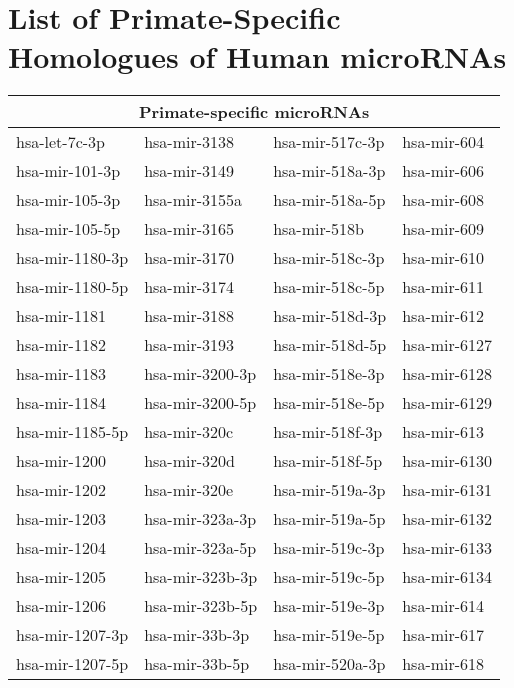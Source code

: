 \chapter{List of Primate-Specific Homologues of Human microRNAs} 
\label{appendix:homologues}

\begin{table}[h]
\centering
\vspace{90pt}
\begin{tabular}{|l|l|l|l|}
\hline
\multicolumn{4}{|c|}{\bf Primate-specific microRNAs} \\
\hline
  \hline
hsa-let-7c-3p & hsa-mir-3138 & hsa-mir-517c-3p & hsa-mir-604 \\ 
  hsa-mir-101-3p & hsa-mir-3149 & hsa-mir-518a-3p & hsa-mir-606 \\ 
  hsa-mir-105-3p & hsa-mir-3155a & hsa-mir-518a-5p & hsa-mir-608 \\ 
  hsa-mir-105-5p & hsa-mir-3165 & hsa-mir-518b & hsa-mir-609 \\ 
  hsa-mir-1180-3p & hsa-mir-3170 & hsa-mir-518c-3p & hsa-mir-610 \\ 
  hsa-mir-1180-5p & hsa-mir-3174 & hsa-mir-518c-5p & hsa-mir-611 \\ 
  hsa-mir-1181 & hsa-mir-3188 & hsa-mir-518d-3p & hsa-mir-612 \\ 
  hsa-mir-1182 & hsa-mir-3193 & hsa-mir-518d-5p & hsa-mir-6127 \\ 
  hsa-mir-1183 & hsa-mir-3200-3p & hsa-mir-518e-3p & hsa-mir-6128 \\ 
  hsa-mir-1184 & hsa-mir-3200-5p & hsa-mir-518e-5p & hsa-mir-6129 \\ 
  hsa-mir-1185-5p & hsa-mir-320c & hsa-mir-518f-3p & hsa-mir-613 \\ 
  hsa-mir-1200 & hsa-mir-320d & hsa-mir-518f-5p & hsa-mir-6130 \\ 
  hsa-mir-1202 & hsa-mir-320e & hsa-mir-519a-3p & hsa-mir-6131 \\ 
  hsa-mir-1203 & hsa-mir-323a-3p & hsa-mir-519a-5p & hsa-mir-6132 \\ 
  hsa-mir-1204 & hsa-mir-323a-5p & hsa-mir-519c-3p & hsa-mir-6133 \\ 
  hsa-mir-1205 & hsa-mir-323b-3p & hsa-mir-519c-5p & hsa-mir-6134 \\ 
  hsa-mir-1206 & hsa-mir-323b-5p & hsa-mir-519e-3p & hsa-mir-614 \\ 
  hsa-mir-1207-3p & hsa-mir-33b-3p & hsa-mir-519e-5p & hsa-mir-617 \\ 
  hsa-mir-1207-5p & hsa-mir-33b-5p & hsa-mir-520a-3p & hsa-mir-618 \\ 

\end{tabular}
\end{table}
